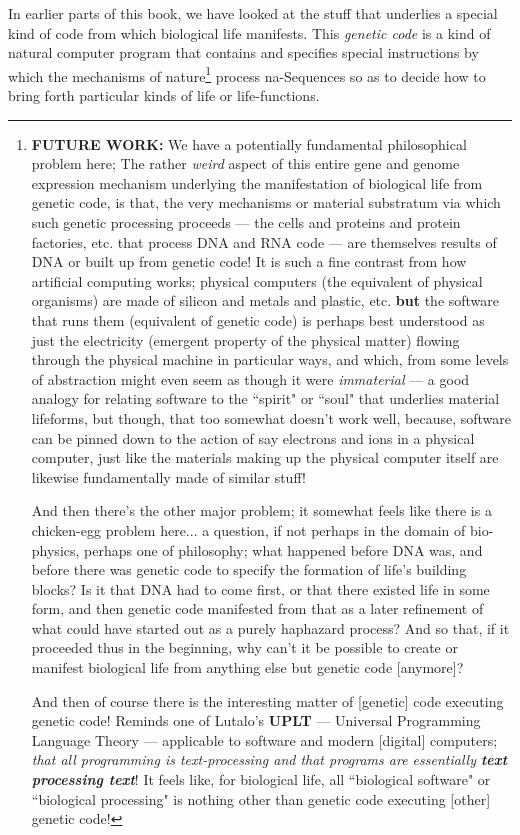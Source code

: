 \documentclass[a4paper, 18pt]{book} %
\begin{document}
In earlier parts of this book, we have looked at the stuff that underlies a special kind of code from which biological life manifests. This \textit{genetic code} is a kind of natural computer program that contains and specifies special instructions by which the mechanisms of nature\footnote{\textbf{FUTURE WORK:} We have a potentially fundamental philosophical problem here; The rather \textit{weird} aspect of this entire gene and genome expression mechanism underlying the manifestation of biological life from genetic code, is that, the very mechanisms or material substratum via which such genetic processing proceeds --- the cells and proteins and protein factories, etc. that process DNA and RNA code --- are themselves results of DNA or built up from genetic code! It is such a fine contrast from how artificial computing works; physical computers (the equivalent of physical organisms) are made of silicon and metals and plastic, etc. \textbf{but} the software that runs them (equivalent of genetic code) is perhaps best understood as just the electricity (emergent property of the physical matter) flowing through the physical machine in particular ways, and which, from some levels of abstraction might even seem as though it were \textit{immaterial} --- a good analogy for relating software to the ``spirit" or ``soul" that underlies material lifeforms, but though, that too somewhat doesn't work well, because, software can be pinned down to the action of say electrons and ions in a physical computer, just like the materials making up the physical computer itself are likewise fundamentally made of similar stuff! 

And then there's the other major problem; it somewhat feels like there is a chicken-egg problem here... a question, if not perhaps in the domain of bio-physics, perhaps one of philosophy; what happened before DNA was, and before there was genetic code to specify the formation of life's building blocks? Is it that DNA had to come first, or that there existed life in some form, and then genetic code manifested from that as a later refinement of what could have started out as a purely haphazard process? And so that, if it proceeded thus in the beginning, why can't it be possible to create or manifest biological life from anything else but genetic code [anymore]?

And then of course there is the interesting matter of [genetic] code executing genetic code! Reminds one of Lutalo's \textbf{UPLT} --- Universal Programming Language Theory --- applicable to software and modern [digital] computers; \textit{that all programming is text-processing and that programs are essentially \textbf{text processing text}}\cite{lutalo2024software}! It feels like, for biological life, all ``biological software" or ``biological processing" is nothing other than genetic code executing [other] genetic code!} process na-Sequences so as to decide how to bring forth particular kinds of life or life-functions.
\end{document}
